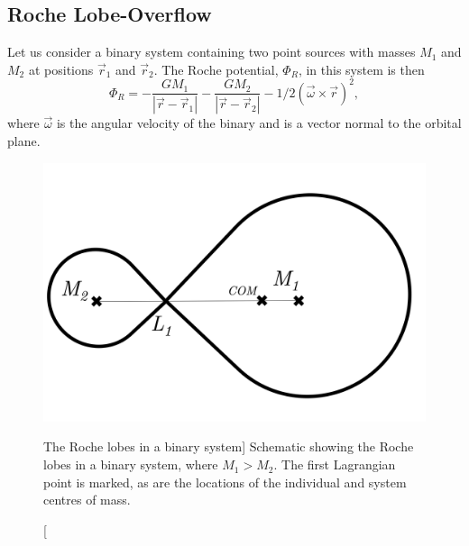 \subsection{Roche Lobe-Overflow}
\label{sec:rlof}
Let us consider a binary system containing two point sources
with masses $M_1$ and $M_2$ at positions
$\vec{r}_1$ and $\vec{r}_2$. The Roche potential, $\Phi_R$, in this system 
is then
\begin{equation}
\Phi_R = - \frac{GM_1}{| \vec{r} - \vec{r}_1 |} - 
\frac{GM_2}{| \vec{r} - \vec{r}_2 |} - 1/2 (\vec{\omega} \times
 \vec{r})^2,
\label{eq:roche}
\end{equation} 
where $\vec{\omega}$ is the angular velocity of the binary and is a vector normal to
the orbital plane. 

\begin{figure}
\centering
\includegraphics[width=1.0\textwidth]{figures/01-intro/roche_lobe.png}
\caption
[The Roche lobes in a binary system]
{
Schematic showing the Roche lobes in a binary system, where $M_1 > M_2$.
The first Lagrangian point is marked, as are the locations of the individual
and system centres of mass.
} 
\label{fig:roche}
\end{figure}

